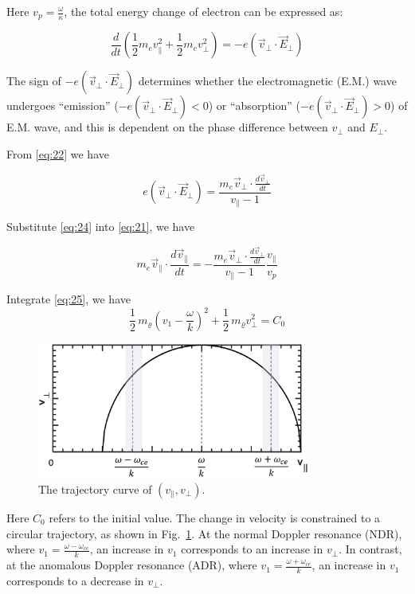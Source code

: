 \documentclass{cpbtex3}
\begin{document}
Here $v_p = \frac{\omega}{\kappa}$, the total energy change of electron can be expressed as:

\begin{equation}
\frac{d}{dt} \left( \frac{1}{2} m_e v_\parallel^2 + \frac{1}{2} m_e v_\perp^2 \right) = -e(\vec{v}_\perp \cdot \vec{E}_\perp) \label{eq:23}
\end{equation}

The sign of $-e(\vec{v}_\perp \cdot \vec{E}_\perp)$ determines whether the electromagnetic (E.M.) wave undergoes ``emission'' ($-e(\vec{v}_\perp \cdot \vec{E}_\perp) < 0$) or ``absorption'' ($-e(\vec{v}_\perp \cdot \vec{E}_\perp) > 0$) of E.M. wave, and this is dependent on the phase difference between $v_\perp$ and $E_\perp$.

From \eqref{eq:22} we have

\begin{equation}
e(\vec{v}_\perp \cdot \vec{E}_\perp) = \frac{m_e \vec{v}_\perp \cdot \frac{d\vec{v}_\perp}{dt}}{v_\parallel - 1} \label{eq:24}
\end{equation}

Substitute \eqref{eq:24} into \eqref{eq:21}, we have

\begin{equation}
m_e \vec{v}_\parallel \cdot \frac{d\vec{v}_\parallel}{dt} = -\frac{m_e \vec{v}_\perp \cdot \frac{d\vec{v}_\perp}{dt}}{v_\parallel - 1} \frac{v_\parallel}{v_p} \label{eq:25}
\end{equation}

Integrate \eqref{eq:25}, we have
\begin{equation}
\frac{1}{2}\,m_{\varrho}\left(v_{1}-\frac{\omega}{k}\right)^{2}+\frac{1}{2}\,m_{\varrho}v_{\perp}^{2}=C_{0}
\label{eq:26}
\end{equation}
\begin{figure}[htbp]
\centering
\includegraphics[width=0.8\textwidth]{Figure8.eps}%
\caption{\label{fig:8}The trajectory curve of $ (v_\parallel,v_\perp)$.}
\end{figure}
Here $C_{0}$ refers to the initial value. The change in velocity is constrained to a circular trajectory, as shown in Fig.~\ref{fig:8}. At the normal Doppler resonance (NDR), where $v_{1}=\frac{\omega-\omega_{ce}}{k}$, an increase in $v_{1}$ corresponds to an increase in $v_{\perp}$. In contrast, at the anomalous Doppler resonance (ADR), where $v_{1}=\frac{\omega+\omega_{ce}}{k}$, an increase in $v_{1}$ corresponds to a decrease in $v_{\perp}$.
\end{document}
